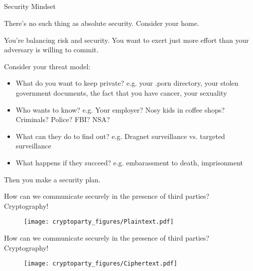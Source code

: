 \documentclass{beamer}
\begin{document}
\subsection{}

\begin{frame}{Security Mindset}


There's no such thing as absolute security. Consider your home. 

\bigskip

You're balancing risk and security. You want to exert just more effort than your adversary is willing to commit.

\bigskip

Consider your threat model:
\begin{itemize}
\item What do you want to keep private? e.g. your .porn directory, your stolen government documents, the fact that you have cancer, your sexuality
\item Who wants to know? e.g. Your employer? Nosy kids in coffee shops? Criminals? Police? FBI? NSA?
\item What can they do to find out? e.g. Dragnet surveillance vs. targeted surveillance 
\item What happens if they succeed? e.g. embarassment to death, imprisonment
\end{itemize}

\bigskip

Then you make a security plan.
\bigskip

\end{frame}

\begin{frame}{How can we communicate securely in the presence of third parties? Cryptography!}

\begin{figure}
\centering
\texttt{[image: cryptoparty\_figures/Plaintext.pdf]}
\end{figure}

\end{frame}
\begin{frame}{How can we communicate securely in the presence of third parties? Cryptography!}

\begin{figure}
\centering
\texttt{[image: cryptoparty\_figures/Ciphertext.pdf]}
\end{figure}

\end{frame}
\end{document}
